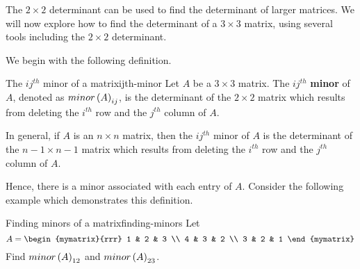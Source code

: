 The $2 \times 2$ determinant can be used to find the determinant of larger matrices.
We will now explore how to find the determinant of a $3 \times 3$ matrix, using several tools
including the $2 \times 2$ determinant.

We begin with the following definition. 

\begin{definition}{The $ij^{th}$ minor of a matrix}{ijth-minor}
Let $A$ be a $3\times 3$ matrix. The $ij^{th}$ \textbf{minor} of $A$, denoted as $minor\left(A\right) _{ij}$, is the determinant
of the $2\times 2$ matrix which results from deleting the $i^{th}$ row and
the $j^{th}$ column of $A$.

In general, if $A$ is an $n\times n$ matrix, then the $ij^{th}$ minor of $A$ is the determinant of the $n-1 \times n-1$ matrix which results from deleting the $i^{th}$ row and the $j^{th}$ column of $A$. 
\end{definition}

Hence, there is a minor associated with each entry of $A$. Consider the following example which demonstrates this definition. 

\begin{example}{Finding minors of a matrix}{finding-minors}
Let 
\begin{equation*}
A = \begin{mymatrix}{rrr}
1 & 2 & 3 \\
4 & 3 & 2 \\
3 & 2 & 1
\end{mymatrix} 
\end{equation*}
Find $minor\left(A\right) _{12}$ and $minor\left(A\right) _{23}$.
\end{example}

